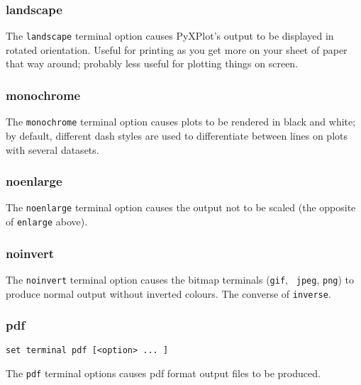 \subsubsection{landscape}

The {\tt landscape} terminal option causes PyXPlot's output to be displayed in
rotated orientation.  Useful for printing as you get more on your sheet of
paper that way around; probably less useful for plotting things on screen.

\subsubsection{monochrome}

The {\tt monochrome} terminal option causes plots to be rendered in black and
white; by default, different dash styles are used to differentiate between
lines on plots with several datasets.

\subsubsection{noenlarge}

The {\tt noenlarge} terminal option causes the output not to be scaled (the
opposite of {\tt enlarge} above).

\subsubsection{noinvert}

The {\tt noinvert} terminal option causes the bitmap terminals ({\tt gif}, {\tt
jpeg}, {\tt png}) to produce normal output without inverted colours. The
converse of {\tt inverse}.


\subsubsection{pdf}

\begin{verbatim}
set terminal pdf [<option> ... ]
\end{verbatim}

The {\tt pdf} terminal options causes pdf format output files to be produced.

